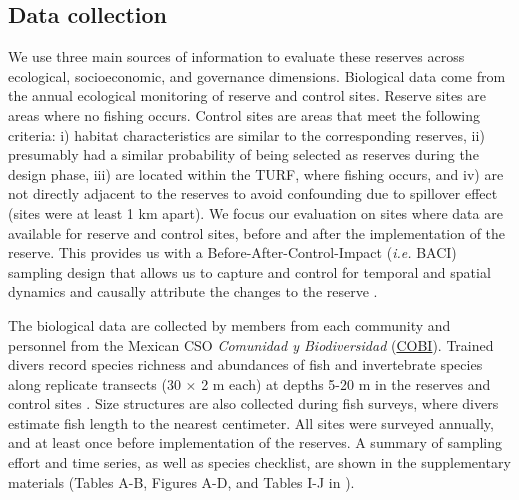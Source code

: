 \documentclass[10pt,letterpaper]{article}
\begin{document}
\subsection*{Data collection}

We use three main sources of information to evaluate these reserves across ecological, socioeconomic, and governance dimensions. Biological data come from the annual ecological monitoring of reserve and control sites. Reserve sites are areas where no fishing occurs. Control sites are areas that meet the following criteria: i) habitat characteristics are similar to the corresponding reserves, ii) presumably had a similar probability of being selected as reserves during the design phase, iii) are located within the TURF, where fishing occurs, and iv) are not directly adjacent to the reserves to avoid confounding due to spillover effect (sites were at least 1 km apart). We focus our evaluation on sites where data are available for reserve and control sites, before and after the implementation of the reserve. This provides us with a Before-After-Control-Impact (\emph{i.e.} BACI) sampling design that allows us to capture and control for temporal and spatial dynamics and causally attribute the changes to the reserve \cite{stewartoaten_1986,francinifilho_2008,depalma_2018,kerr_2019,Villasenor-Derbez_2018}.

The biological data are collected by members from each community and personnel from the Mexican CSO \emph{Comunidad y Biodiversidad} (\href{https://www.cobi.org.mx}{COBI}). Trained divers record species richness and abundances of fish and invertebrate species along replicate transects (30 $\times$ 2 m each) at depths 5-20 m in the reserves and control sites \cite{suman_2010-ez,fulton_2018,fulton_2019}. Size structures are also collected during fish surveys, where divers estimate fish length to the nearest centimeter. All sites were surveyed annually, and at least once before implementation of the reserves. A summary of sampling effort and time series, as well as species checklist, are shown in the supplementary materials (Tables A-B, Figures A-D, and Tables I-J in ).
\end{document}
